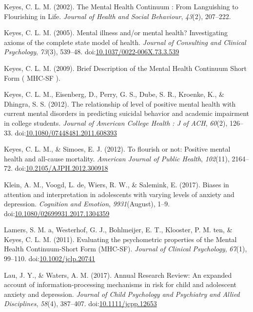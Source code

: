 \documentclass[man,floatsintext]{apa6}
\begin{document}
\leavevmode\hypertarget{ref-Keyes2002}{}%
Keyes, C. L. M. (2002). The Mental Health Continuum : From Languishing to Flourishing in Life. \emph{Journal of Health and Social Behaviour}, \emph{43}(2), 207--222.

\leavevmode\hypertarget{ref-Keyes2005}{}%
Keyes, C. L. M. (2005). Mental illness and/or mental health? Investigating axioms of the complete state model of health. \emph{Journal of Consulting and Clinical Psychology}, \emph{73}(3), 539--48. doi:\href{https://doi.org/10.1037/0022-006X.73.3.539}{10.1037/0022-006X.73.3.539}

\leavevmode\hypertarget{ref-Keyes2009}{}%
Keyes, C. L. M. (2009). Brief Description of the Mental Health Continuum Short Form ( MHC-SF ).

\leavevmode\hypertarget{ref-Keyes2012a}{}%
Keyes, C. L. M., Eisenberg, D., Perry, G. S., Dube, S. R., Kroenke, K., \& Dhingra, S. S. (2012). The relationship of level of positive mental health with current mental disorders in predicting suicidal behavior and academic impairment in college students. \emph{Journal of American College Health : J of ACH}, \emph{60}(2), 126--33. doi:\href{https://doi.org/10.1080/07448481.2011.608393}{10.1080/07448481.2011.608393}

\leavevmode\hypertarget{ref-Keyes2012}{}%
Keyes, C. L. M., \& Simoes, E. J. (2012). To flourish or not: Positive mental health and all-cause mortality. \emph{American Journal of Public Health}, \emph{102}(11), 2164--72. doi:\href{https://doi.org/10.2105/AJPH.2012.300918}{10.2105/AJPH.2012.300918}

\leavevmode\hypertarget{ref-klein_biases_2017}{}%
Klein, A. M., Voogd, L. de, Wiers, R. W., \& Salemink, E. (2017). Biases in attention and interpretation in adolescents with varying levels of anxiety and depression. \emph{Cognition and Emotion}, \emph{9931}(August), 1--9. doi:\href{https://doi.org/10.1080/02699931.2017.1304359}{10.1080/02699931.2017.1304359}

\leavevmode\hypertarget{ref-Lamers2011}{}%
Lamers, S. M. a, Westerhof, G. J., Bohlmeijer, E. T., Klooster, P. M. ten, \& Keyes, C. L. M. (2011). Evaluating the psychometric properties of the Mental Health Continuum-Short Form (MHC-SF). \emph{Journal of Clinical Psychology}, \emph{67}(1), 99--110. doi:\href{https://doi.org/10.1002/jclp.20741}{10.1002/jclp.20741}

\leavevmode\hypertarget{ref-lau_annual_2017}{}%
Lau, J. Y., \& Waters, A. M. (2017). Annual Research Review: An expanded account of information-processing mechanisms in risk for child and adolescent anxiety and depression. \emph{Journal of Child Psychology and Psychiatry and Allied Disciplines}, \emph{58}(4), 387--407. doi:\href{https://doi.org/10.1111/jcpp.12653}{10.1111/jcpp.12653}
\end{document}
